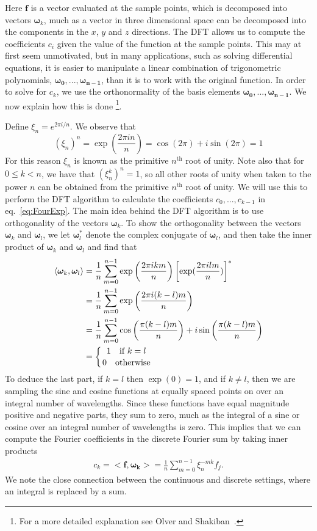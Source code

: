 Here $\bm f$ is a vector evaluated at the sample points, which is decomposed into vectors $\bm{\omega}_k$, much as a vector in three dimensional space can be decomposed into the components in the $x$, $y$ and $z$ directions. The DFT allows us to compute the coefficients $c_i$ given the value of the function at the sample points. This may at first seem unmotivated, but in many applications, such as solving differential equations, it is easier to manipulate a linear combination of trigonometric polynomials,  $\bm{\omega_0},...,\bm{\omega_{n-1}}$, than it is to work with the original function. In order to solve for $c_k$, we use the orthonormality of the basis elements $\bm{\omega_0},...,\bm{\omega_{n-1}}$. We now explain how this is done \footnote{For a more detailed explanation see Olver and Shakiban~\cite{OlvSha06}.}. 

Define $\xi_n=e^{2\pi i/n}$. We observe that 
\begin{equation}
\left(\xi_n\right)^n=\exp\left(\frac{2\pi i n}{n}\right)=\cos(2\pi ) +i\sin(2\pi )=1
\end{equation}
For this reason $\xi_n$ is known as the primitive $n^{\text{th}}$ root of unity. Note also that for $0\leq k < n$, we have that $(\xi_n^k)^n=1$, so all other roots of unity when taken to the power $n$ can be obtained from the primitive $n^{\text{th}}$ root of unity. We will use this to perform the DFT algorithm to calculate the coefficients $c_0,...,c_{k-1}$ in eq.\ \eqref{eq:FourExp}. The main idea behind the DFT algorithm is to use orthogonality of the vectors $\bm \omega_k$. To show the orthogonality between the vectors $\bm \omega_k$ and $\bm \omega_l$, we let $\bm \omega_l^*$ denote the complex conjugate of $\bm \omega_l$, and then take the inner product of $\bm \omega_k$ and $\bm \omega_l$ and find that
\begin{align*}
\left<\bm \omega_k, \bm \omega_l \right>&{}=\frac{1}{n}\sum_{m=0}^{n-1}\exp\left(\frac{2\pi ik m}{n}\right)\left[\exp(\frac{2\pi il m}{n})\right]^*
\\&{}=\frac{1}{n}\sum_{m=0}^{n-1}\exp\left(\frac{2\pi i(k-l) m}{n}\right)
\\&{}=\frac{1}{n}\sum_{m=0}^{n-1}\cos\left(\frac{\pi(k-l)m}{n}\right)+i\sin\left(\frac{\pi(k-l)m}{n}\right)
\\&{}=\left\{{1\quad\textup{if } k=l}\atop{0\quad\textup{otherwise}}\right.
\end{align*}
To deduce the last part, if $k=l$ then $\exp(0)=1$, and if $k\ne l$, then we are sampling the sine and cosine functions at equally spaced points on over an integral number of wavelengths. Since these functions have equal magnitude positive and negative parts, they sum to zero, much as the integral of a sine or cosine over an integral number of wavelengths is zero. This implies that we can compute the Fourier coefficients in the discrete Fourier sum by taking inner products 
\begin{eqnarray}
c_k=<\bm{f},\bm{\omega_k}>=\frac{1}{n} \sum\limits_{m=0}^{n-1} \xi_n^{-mk}f_j.
\end{eqnarray} 
We note the close connection between the continuous and discrete settings, where an integral is replaced by a sum.

